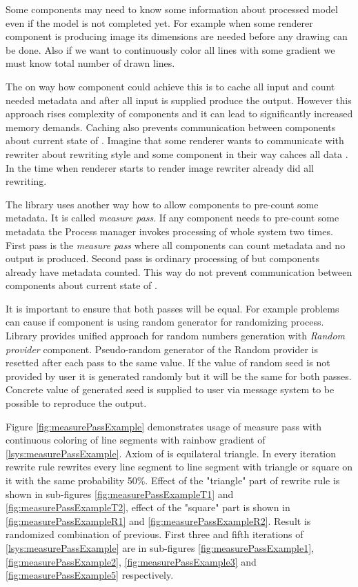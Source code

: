 Some components may need to know some information about processed model even if the model is not completed yet.
For example when some renderer component is producing image its dimensions are needed before any drawing can be done.
Also if we want to continuously color all lines with some gradient we must know total number of drawn lines.

The on way how component could achieve this is to cache all input and count needed metadata and after all input is supplied produce the output.
However this approach rises complexity of components and it can lead to significantly increased memory demands.
Caching also prevents communication between components about current state of \lsystem.
Imagine that some renderer wants to communicate with rewriter about rewriting style and some component in their way cahces all data .
In the time when renderer starts to render image rewriter already did all rewriting.

The library uses another way how to allow components to pre-count some metadata.
It is called \emph{measure pass}.
If any component needs to pre-count some metadata the Process manager invokes processing of whole system two times.
First pass is the \emph{measure pass} where all components can count metadata and no output is produced.
Second pass is ordinary processing of \lsystem but components already have metadata counted.
This way do not prevent communication between components about current state of \lsystem.

It is important to ensure that both passes will be equal.
For example problems can cause if component is using random generator for randomizing process.
Library provides unified approach for random numbers generation with \emph{Random provider} component.
Pseudo-random generator of the Random provider is resetted after each pass to the same value.
If the value of random seed is not provided by user it is generated randomly but it will be the same for both passes.
Concrete value of generated seed is supplied to user via message system to be possible to reproduce the output.

Figure \ref{fig:measurePassExample} demonstrates usage of measure pass with continuous coloring of line segments with rainbow gradient of \lsystem \ref{lsys:measurePassExample}.
Axiom of \lsystem is equilateral triangle.
In every iteration rewrite rule rewrites every line segment to line segment with triangle or square on it with the same probability 50\%.
Effect of the "triangle" part of rewrite rule is shown in sub-figures \ref{fig:measurePassExampleT1} and \ref{fig:measurePassExampleT2},
	effect of the "square" part is shown in \ref{fig:measurePassExampleR1} and \ref{fig:measurePassExampleR2}.
Result is randomized combination of previous.
First three and fifth iterations of \lsystem \ref{lsys:measurePassExample} are in sub-figures \ref{fig:measurePassExample1}, \ref{fig:measurePassExample2}, \ref{fig:measurePassExample3} and \ref{fig:measurePassExample5} respectively.

